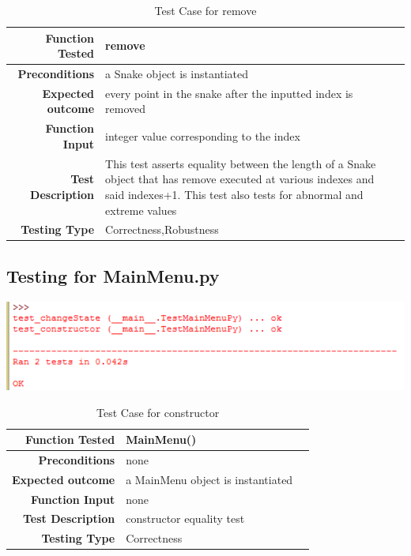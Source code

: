 \documentclass[12pt]{article}
\begin{document}
\begin{center}
	\begin{longtable}{ | r | p{4cm} | p{10cm} }
	\caption{Test Case for remove} \\ \hline \label{TblInputVar} 
	\textbf{Function Tested} & remove\\ \hline
	\textbf{Preconditions} & a Snake object is instantiated \\ \hline
	\textbf{Expected outcome} & every point in the snake after the inputted index is removed \\ \hline
	\textbf{Function Input} & integer value corresponding to the index \\ \hline
	\textbf{Test Description} & This test asserts equality between the length of a Snake object that has remove executed at various indexes and said indexes+1. This test also tests for abnormal and extreme values\\ \hline
	\textbf{Testing Type} & Correctness,Robustness\\ \hline
	
	\end{longtable}
\end{center}

\subsection{Testing for MainMenu.py}
\includegraphics{testMainMenuResults}\newline\newline
\begin{center}
	\begin{longtable}{ | r | p{4cm} | p{10cm} }
	\caption{Test Case for constructor} \\ \hline \label{TblInputVar} 
	\textbf{Function Tested} & MainMenu() \\ \hline
	\textbf{Preconditions} & none \\ \hline
	\textbf{Expected outcome} & a MainMenu object is instantiated \\ \hline
	\textbf{Function Input} & none \\ \hline
	\textbf{Test Description} & constructor equality test\\ \hline
	\textbf{Testing Type} & Correctness\\ \hline
	
	\end{longtable}
\end{center}
\end{document}

